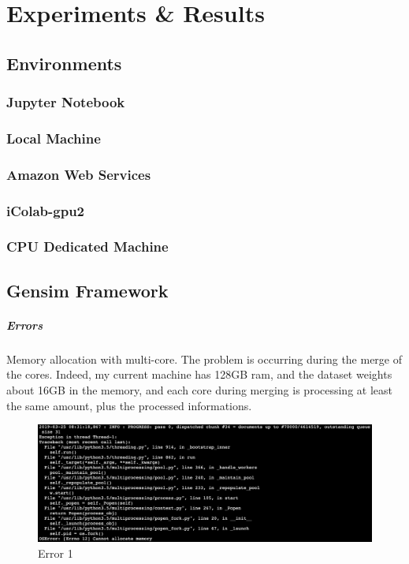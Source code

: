 

\chapter{Experiments \& Results}
\label{chap:experiments-results}
\section{Environments}
\subsection{Jupyter Notebook}
\subsection{Local Machine}
\subsection{Amazon Web Services}
\subsection{iColab-gpu2}
\subsection{CPU Dedicated Machine}


\section{Gensim Framework}
\paragraph{Errors} Memory allocation with multi-core. The problem is occurring during the merge of the cores. Indeed, my current machine has 128GB ram, and the dataset weights about 16GB in the memory, and each core during merging is processing at least the same amount, plus the processed informations.\\ 

\begin{figure}[htbp]
\centering
\includegraphics[width=\linewidth]{99-imgs/gensim_memory_allocation_error}
\caption{Error 1}
\label{fig:error-1}
\end{figure}

